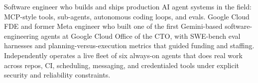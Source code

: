 


Software engineer who builds and ships production AI agent systems in the field: MCP-style tools, sub-agents, autonomous coding loops, and evals. Google Cloud FDE and former Meta engineer who built one of the first Gemini-based software-engineering agents at Google Cloud Office of the CTO, with SWE-bench eval harnesses and planning-versus-execution metrics that guided funding and staffing. Independently operates a live fleet of six always-on agents that does real work across repos, CI, scheduling, messaging, and credentialed tools under explicit security and reliability constraints.








